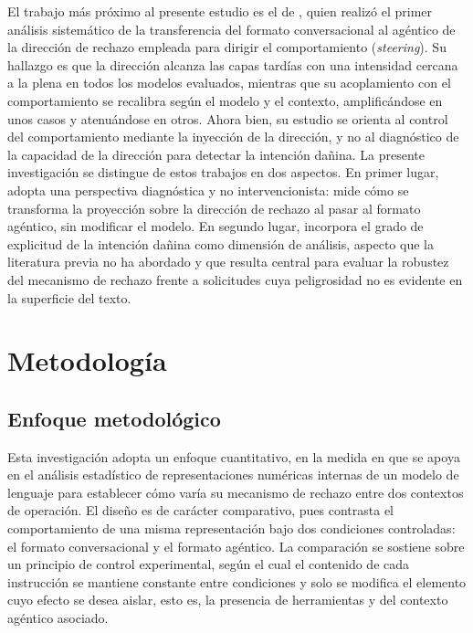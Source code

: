 \documentclass[12pt,a4paper]{article}
\newcommand{\textcite}[1]{\citet{#1}}
\begin{document}
El trabajo más próximo al presente estudio es el de \textcite{pinto2026}, quien realizó el primer análisis sistemático de la transferencia del formato conversacional al agéntico de la dirección de rechazo empleada para dirigir el comportamiento (\textit{steering}). Su hallazgo es que la dirección alcanza las capas tardías con una intensidad cercana a la plena en todos los modelos evaluados, mientras que su acoplamiento con el comportamiento se recalibra según el modelo y el contexto, amplificándose en unos casos y atenuándose en otros. Ahora bien, su estudio se orienta al control del comportamiento mediante la inyección de la dirección, y no al diagnóstico de la capacidad de la dirección para detectar la intención dañina. La presente investigación se distingue de estos trabajos en dos aspectos. En primer lugar, adopta una perspectiva diagnóstica y no intervencionista: mide cómo se transforma la proyección sobre la dirección de rechazo al pasar al formato agéntico, sin modificar el modelo. En segundo lugar, incorpora el grado de explicitud de la intención dañina como dimensión de análisis, aspecto que la literatura previa no ha abordado y que resulta central para evaluar la robustez del mecanismo de rechazo frente a solicitudes cuya peligrosidad no es evidente en la superficie del texto.

\section{Metodología}

\subsection{Enfoque metodológico}

\justifying

Esta investigación adopta un enfoque cuantitativo, en la medida en que se apoya en el análisis estadístico de representaciones numéricas internas de un modelo de lenguaje para establecer cómo varía su mecanismo de rechazo entre dos contextos de operación. El diseño es de carácter comparativo, pues contrasta el comportamiento de una misma representación bajo dos condiciones controladas: el formato conversacional y el formato agéntico. La comparación se sostiene sobre un principio de control experimental, según el cual el contenido de cada instrucción se mantiene constante entre condiciones y solo se modifica el elemento cuyo efecto se desea aislar, esto es, la presencia de herramientas y del contexto agéntico asociado.
\end{document}
